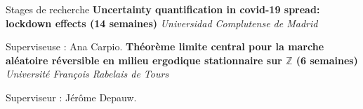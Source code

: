 \begin{rubric}{Stages de recherche}
\entry*[2020]%
\textbf{Uncertainty quantification in covid-19 spread: lockdown effects (14 semaines)} \emph{Universidad Complutense de Madrid}
    \par Superviseuse : Ana Carpio.
%
\entry*[2019]%
\textbf{Théorème limite central pour la marche aléatoire réversible en milieu ergodique stationnaire sur $\mathbb{Z}$ (6 semaines)} \emph{Universit\'e Fran\c cois Rabelais de Tours}
    \par Superviseur : J\'er\^ome Depauw.
%

\end{rubric}